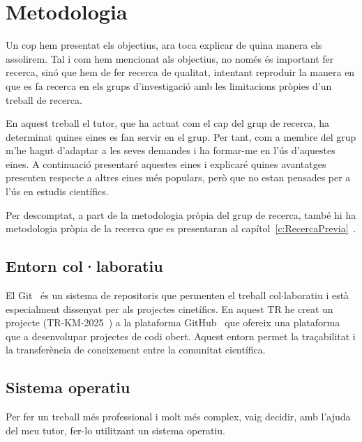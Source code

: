 \chapter{Metodologia}
\label{c:Metodologia}


Un cop hem presentat els objectius, ara toca explicar de quina manera els assolirem. Tal i com hem mencionat als objectius, no només és important fer recerca, sinó que hem de fer recerca de qualitat, intentant reproduir la manera en que es fa recerca en els grups d'investigació amb les limitacions pròpies d'un treball de recerca.

En aquest treball el tutor, que ha actuat com el cap del grup de recerca, ha determinat quines eines es fan servir en el grup. Per tant, com a membre del grup m'he hagut d'adaptar a les seves demandes i ha formar-me en l'ús d'aquestes eines. A continuació presentaré aquestes eines i explicaré quines avantatges presenten respecte a altres eines més populars, però que no estan pensades per a l'ús en estudis científics.

Per descomptat, a part de la metodologia pròpia del grup de recerca, també hi ha metodologia pròpia de la recerca que es presentaran al capítol~\ref{c:RecercaPrevia}~.



\section{Entorn col·laboratiu} \label{sec:Entorn Col·laboratiu}

El Git~\cite{git} és un sistema de repositoris que permenten el treball col$\cdot$laboratiu i està especialment dissenyat per als projectes cinetífics. En aquest TR he creat un projecte (TR-KM-2025~\cite{TR-KM-2025}) a
la plataforma GitHub~\cite{GitHub} que ofereix una plataforma que a desenvolupar projectes de codi obert. Aquest entorn permet la traçabilitat i la transferència de coneixement entre la comunitat científica.


\section{Sistema operatiu}
Per fer un treball més professional i molt més complex, vaig decidir, amb l’ajuda del meu tutor, fer-lo utilitzant un sistema operatiu.

